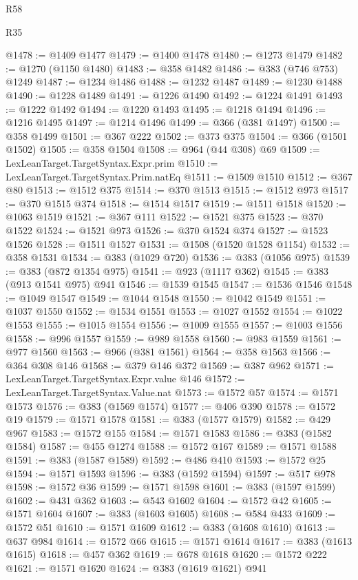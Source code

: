 \begin{lexlean}{R58}
\begin{lexlean}{R35}
\begin{coremodule}
{{{{{{{{{{{{{{{{{{{{{{{{{{{{{{{{{{{{{{{{{{{{{{{{{{{{@1478 := @1409 @1477
@1479 := @1400 @1478
@1480 := @1273 @1479
@1482 := @1270 (@1150 @1480)
@1483 := @358 @1482
@1486 := @383 (@746 @753) @1249
@1487 := @1234 @1486
@1488 := @1232 @1487
@1489 := @1230 @1488
@1490 := @1228 @1489
@1491 := @1226 @1490
@1492 := @1224 @1491
@1493 := @1222 @1492
@1494 := @1220 @1493
@1495 := @1218 @1494
@1496 := @1216 @1495
@1497 := @1214 @1496
@1499 := @366 (@381 @1497)
@1500 := @358 @1499
@1501 := @367 @222
@1502 := @373 @375
@1504 := @366 (@1501 @1502)
@1505 := @358 @1504
@1508 := @964 (@44 @308) @69
@1509 := LexLeanTarget.TargetSyntax.Expr.prim
@1510 := LexLeanTarget.TargetSyntax.Prim.natEq
@1511 := @1509 @1510
@1512 := @367 @80
@1513 := @1512 @375
@1514 := @370 @1513
@1515 := @1512 @973
@1517 := @370 @1515 @374
@1518 := @1514 @1517
@1519 := @1511 @1518
@1520 := @1063 @1519
@1521 := @367 @111
@1522 := @1521 @375
@1523 := @370 @1522
@1524 := @1521 @973
@1526 := @370 @1524 @374
@1527 := @1523 @1526
@1528 := @1511 @1527
@1531 := @1508 (@1520 @1528 @1154)
@1532 := @358 @1531
@1534 := @383 (@1029 @720)
@1536 := @383 (@1056 @975)
@1539 := @383 (@872 @1354 @975)
@1541 := @923 (@1117 @362)
@1545 := @383 (@913 @1541 @975) @941
@1546 := @1539 @1545
@1547 := @1536 @1546
@1548 := @1049 @1547
@1549 := @1044 @1548
@1550 := @1042 @1549
@1551 := @1037 @1550
@1552 := @1534 @1551
@1553 := @1027 @1552
@1554 := @1022 @1553
@1555 := @1015 @1554
@1556 := @1009 @1555
@1557 := @1003 @1556
@1558 := @996 @1557
@1559 := @989 @1558
@1560 := @983 @1559
@1561 := @977 @1560
@1563 := @966 (@381 @1561)
@1564 := @358 @1563
@1566 := @364 @308 @146
@1568 := @379 @146 @372
@1569 := @387 @962
@1571 := LexLeanTarget.TargetSyntax.Expr.value @146
@1572 := LexLeanTarget.TargetSyntax.Value.nat
@1573 := @1572 @57
@1574 := @1571 @1573
@1576 := @383 (@1569 @1574)
@1577 := @406 @390
@1578 := @1572 @19
@1579 := @1571 @1578
@1581 := @383 (@1577 @1579)
@1582 := @429 @967
@1583 := @1572 @155
@1584 := @1571 @1583
@1586 := @383 (@1582 @1584)
@1587 := @455 @1274
@1588 := @1572 @167
@1589 := @1571 @1588
@1591 := @383 (@1587 @1589)
@1592 := @486 @410
@1593 := @1572 @25
@1594 := @1571 @1593
@1596 := @383 (@1592 @1594)
@1597 := @517 @978
@1598 := @1572 @36
@1599 := @1571 @1598
@1601 := @383 (@1597 @1599)
@1602 := @431 @362
@1603 := @543 @1602
@1604 := @1572 @42
@1605 := @1571 @1604
@1607 := @383 (@1603 @1605)
@1608 := @584 @433
@1609 := @1572 @51
@1610 := @1571 @1609
@1612 := @383 (@1608 @1610)
@1613 := @637 @984
@1614 := @1572 @66
@1615 := @1571 @1614
@1617 := @383 (@1613 @1615)
@1618 := @457 @362
@1619 := @678 @1618
@1620 := @1572 @222
@1621 := @1571 @1620
@1624 := @383 (@1619 @1621) @941
}}}}}}}}}}}}}}}}}}}}}}}}}}}}}}}}}}}}}}}}}}}}}}}}}}}}
\end{coremodule}
\end{lexlean}
\end{lexlean}
